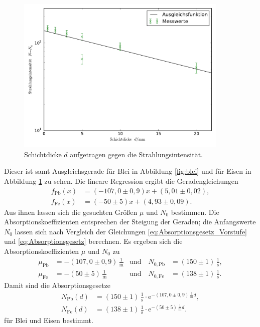 \begin{figure}
	\centering
	\includegraphics[width=0.9\textwidth]{Bilder/Eisen.pdf}
	\caption{Schichtdicke $d$ aufgetragen gegen die Strahlungsintensität.}
	\label{fig:eisen}
\end{figure}
Dieser ist samt Ausgleichsgerade für Blei in Abbildung \ref{fig:blei} und für Eisen in Abbildung \ref{fig:eisen} zu sehen.
Die lineare Regression ergibt die Geradengleichungen 
\begin{align}
f_\mathup{Pb}(x)&=(-107,0\pm0,9)x+(5,01\pm0,02),\\
f_\mathup{Fe}(x)&=(-50\pm5)x+(4,93\pm0,09).
\label{eq:lin_regress}
\end{align}
Aus ihnen lassen sich die gesuchten Größen $\mu$ und $N_0$ bestimmen. 
Die Absorptionskoeffizienten entsprechen der Steigung der Geraden; die Anfangswerte $N_0$ lassen sich nach Vergleich der Gleichungen \eqref{eq:Absorptionsgesetz_Vorstufe} und \eqref{eq:Absorptionsgesetz} berechnen.
Es ergeben sich die Absorptionskoeffizienten $\mu$ und $N_0$ zu
\begin{align}
\mu_\mathup{Pb}&=-(107,0\pm0,9)\,\frac{1}{\si\meter} &\text{und}\quad  N_{0\mathup{,Pb}}&=(150\pm1)\,\frac{1}{\si\second},\\
\mu_\mathup{Fe}&=-(50\pm5)\,\frac{1}{\si\meter}  &\text{und}\quad  N_{0\mathup{,Fe}}&=(138\pm1)\,\frac{1}{\si\second}.
\end{align}
Damit sind die Absorptionsgesetze
\begin{align}
N_\mathup{Pb}(d)&=(150\pm1)\,\frac{1}{\si\second}\cdot\mathup{e}^{-(107,0\pm0,9)\,\frac{1}{\si\meter}d},\\
N_\mathup{Fe}(d)&=(138\pm1)\,\frac{1}{\si\second}\cdot\mathup{e}^{-(50\pm5)\,\frac{1}{\si\meter}d}.
\end{align}
 für Blei und Eisen bestimmt.


